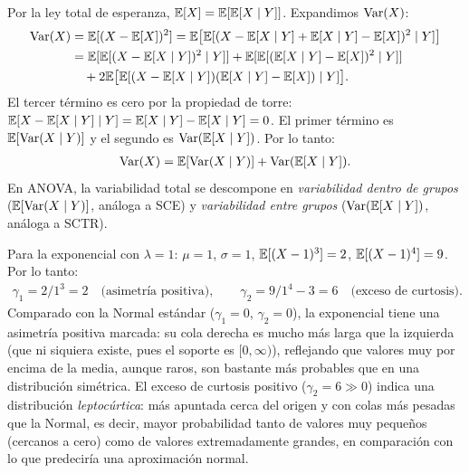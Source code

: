 \begin{solproblema}[prob:de8d740]
	Por la ley total de esperanza, $\mathbb{E}[X]=\mathbb{E}[\mathbb{E}[X\mid Y]]$. Expandimos $\operatorname{Var}(X)$:
	\begin{align*}
		\operatorname{Var}(X) &= \mathbb{E}[(X-\mathbb{E}[X])^2] = \mathbb{E}\big[\mathbb{E}[(X-\mathbb{E}[X\mid Y]+\mathbb{E}[X\mid Y]-\mathbb{E}[X])^2 \mid Y]\big] \\
		&= \mathbb{E}[\mathbb{E}[(X-\mathbb{E}[X\mid Y])^2\mid Y]] + \mathbb{E}[\mathbb{E}[(\mathbb{E}[X\mid Y]-\mathbb{E}[X])^2\mid Y]] \\
		&\quad + 2\mathbb{E}\big[\mathbb{E}[(X-\mathbb{E}[X\mid Y])(\mathbb{E}[X\mid Y]-\mathbb{E}[X])\mid Y]\big].
	\end{align*}
	El tercer término es cero por la propiedad de torre: $\mathbb{E}[X-\mathbb{E}[X\mid Y]\mid Y]=\mathbb{E}[X\mid Y]-\mathbb{E}[X\mid Y]=0$. El primer término es $\mathbb{E}[\operatorname{Var}(X\mid Y)]$ y el segundo es $\operatorname{Var}(\mathbb{E}[X\mid Y])$. Por lo tanto:
	\begin{align*}
		\operatorname{Var}(X) = \mathbb{E}[\operatorname{Var}(X \mid Y)] + \operatorname{Var}(\mathbb{E}[X \mid Y]).
	\end{align*}
	En ANOVA, la variabilidad total se descompone en \emph{variabilidad dentro de grupos} ($\mathbb{E}[\operatorname{Var}(X\mid Y)]$, análoga a SCE) y \emph{variabilidad entre grupos} ($\operatorname{Var}(\mathbb{E}[X\mid Y])$, análoga a SCTR).
\end{solproblema}

\begin{solproblema}[prob:9d4a41b]
	Para la exponencial con $\lambda=1$: $\mu=1$, $\sigma=1$, $\mathbb{E}[(X-1)^3]=2$, $\mathbb{E}[(X-1)^4]=9$. Por lo tanto:
	\begin{align*}
		\gamma_1 = 2/1^3 = 2 \quad \text{(asimetría positiva)}, \qquad \gamma_2 = 9/1^4-3 = 6 \quad \text{(exceso de curtosis)}.
	\end{align*}
	Comparado con la Normal estándar ($\gamma_1=0$, $\gamma_2=0$), la exponencial tiene una asimetría positiva marcada: su cola derecha es mucho más larga que la izquierda (que ni siquiera existe, pues el soporte es $[0,\infty)$), reflejando que valores muy por encima de la media, aunque raros, son bastante más probables que en una distribución simétrica. El exceso de curtosis positivo ($\gamma_2=6 \gg 0$) indica una distribución \emph{leptocúrtica}: más apuntada cerca del origen y con colas más pesadas que la Normal, es decir, mayor probabilidad tanto de valores muy pequeños (cercanos a cero) como de valores extremadamente grandes, en comparación con lo que predeciría una aproximación normal.
\end{solproblema}

